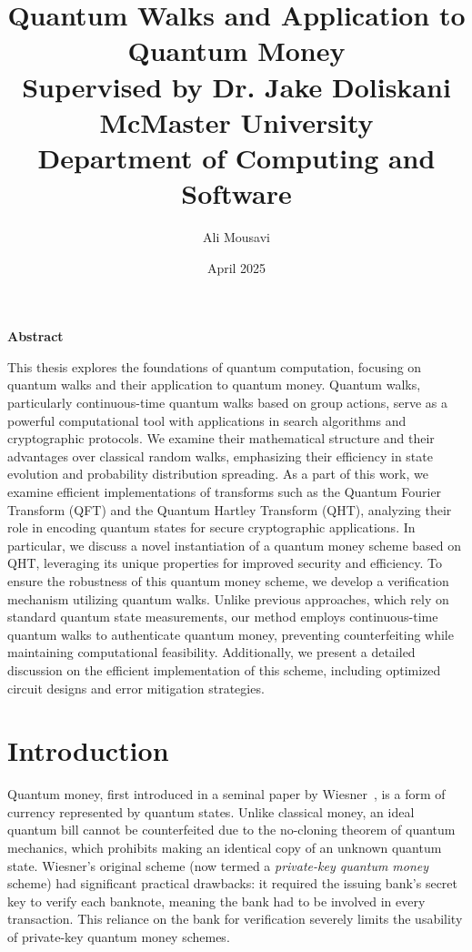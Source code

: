 \documentclass[12pt]{report}
\title{
  Quantum Walks and Application to Quantum Money\\[1em]
  \large Supervised by Dr. Jake Doliskani\\[3em]
  \normalsize McMaster University\\
  Department of Computing and Software
}
\author{Ali Mousavi}
\date{April 2025}
\begin{document}
\maketitle
\tableofcontents


\newpage
\textbf{\large Abstract}

This thesis explores the foundations of quantum computation, focusing on quantum walks and their application to quantum money. Quantum walks, particularly continuous-time quantum walks based on group actions, serve as a powerful computational tool with applications in search algorithms and cryptographic protocols. We examine their mathematical structure and their advantages over classical random walks, emphasizing their efficiency in state evolution and probability distribution spreading. As a part of this work, we examine efficient implementations of transforms such as the Quantum Fourier Transform (QFT) and the Quantum Hartley Transform (QHT), analyzing their role in encoding quantum states for secure cryptographic applications. In particular, we discuss a novel instantiation of a quantum money scheme based on QHT, leveraging its unique properties for improved security and efficiency.
To ensure the robustness of this quantum money scheme, we develop a verification mechanism utilizing quantum walks. Unlike previous approaches, which rely on standard quantum state measurements, our method employs continuous-time quantum walks to authenticate quantum money, preventing counterfeiting while maintaining computational feasibility. Additionally, we present a detailed discussion on the efficient implementation of this scheme, including optimized circuit designs and error mitigation strategies.








\chapter{Introduction}
Quantum money, first introduced in a seminal paper by Wiesner~\cite{Wiesner1983}, is a form of currency represented by quantum states. Unlike classical money, an ideal quantum bill cannot be counterfeited due to the no-cloning theorem of quantum mechanics, which prohibits making an identical copy of an unknown quantum state. Wiesner’s original scheme (now termed a \emph{private-key quantum money} scheme) had significant practical drawbacks: it required the issuing bank’s secret key to verify each banknote, meaning the bank had to be involved in every transaction. This reliance on the bank for verification severely limits the usability of private-key quantum money schemes.
\end{document}
